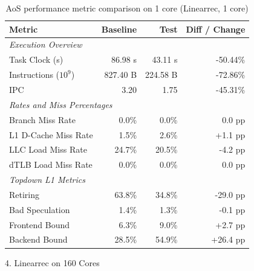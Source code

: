     \begin{table}[htbp]
      \centering
      \caption{AoS performance metric comparison on 1 core (Linearrec, 1 core)}
      \label{tab:perf_comparison_aos_linearrec_1core}
      \begin{tabular}{lrrr}
        \toprule
        \textbf{Metric} & \textbf{Baseline} & \textbf{Test} & \textbf{Diff / Change} \\
        \midrule
        \multicolumn{4}{l}{\textit{Execution Overview}} \\
        \quad Task Clock (s)           & 86.98 s   & 43.11 s   & -50.44\%   \\
        \quad Instructions ($10^9$)    & 827.40 B  & 224.58 B  & -72.86\%   \\
        \quad IPC                      & 3.20       & 1.75       & -45.31\%   \\
        \midrule
        \multicolumn{4}{l}{\textit{Rates and Miss Percentages}} \\
        \quad Branch Miss Rate         & 0.0\%      & 0.0\%      & 0.0 pp     \\
        \quad L1 D-Cache Miss Rate     & 1.5\%      & 2.6\%      & +1.1 pp    \\
        \quad LLC Load Miss Rate       & 24.7\%     & 20.5\%     & -4.2 pp    \\
        \quad dTLB Load Miss Rate      & 0.0\%      & 0.0\%      & 0.0 pp     \\
        \midrule
        \multicolumn{4}{l}{\textit{Topdown L1 Metrics}} \\
        \quad Retiring                 & 63.8\%     & 34.8\%     & -29.0 pp   \\
        \quad Bad Speculation          & 1.4\%     & 1.3\%     & -0.1 pp   \\
        \quad Frontend Bound           & 6.3\%     & 9.0\%     & +2.7 pp   \\
        \quad Backend Bound            & 28.5\%     & 54.9\%     & +26.4 pp   \\
        \bottomrule
      \end{tabular}
    \end{table}

  4. Linearrec on 160 Cores


